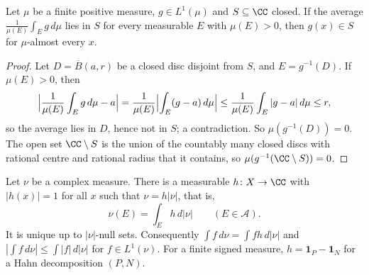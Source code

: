 \begin{lemma}\label{signed-measures:lemma-averages}
Let $\mu$ be a finite positive measure, $g \in L^1(\mu)$ and $S \subseteq \CC$ closed. If the average $\frac{1}{\mu(E)}\int_Eg\,d\mu$ lies in $S$ for every measurable $E$ with $\mu(E) > 0$, then
$g(x) \in S$ for $\mu$-almost every $x$.
\end{lemma}

\begin{proof}
Let $D = \overline{B}(a, r)$ be a closed disc disjoint from $S$, and $E = g^{-1}(D)$. If $\mu(E) > 0$, then
\[
\Bigl|\frac{1}{\mu(E)}\int_Eg\,d\mu - a\Bigr| = \frac{1}{\mu(E)}\Bigl|\int_E(g - a)\,d\mu\Bigr| \leq \frac{1}{\mu(E)}\int_E|g - a|\,d\mu \leq r,
\]
so the average lies in $D$, hence not in $S$; a contradiction. So $\mu(g^{-1}(D)) = 0$. The open set $\CC \setminus S$ is the union of the countably many closed discs with rational centre and rational
radius that it contains, so $\mu(g^{-1}(\CC \setminus S)) = 0$.
\end{proof}

\begin{theorem}\label{signed-measures:theorem-polar}
Let $\nu$ be a complex measure. There is a measurable $h \colon X \to \CC$ with $|h(x)| = 1$ for all $x$ such that $\nu = h|\nu|$, that is,
\[
\nu(E) = \int_Eh\,d|\nu| \qquad (E \in \mathcal{A}).
\]
It is unique up to $|\nu|$-null sets. Consequently $\int f\,d\nu = \int fh\,d|\nu|$ and $|\int f\,d\nu| \leq \int|f|\,d|\nu|$ for $f \in L^1(\nu)$. For a finite signed measure, $h = \mathbf{1}_P - \mathbf{1}_N$ for a Hahn
decomposition $(P, N)$.
\end{theorem}

